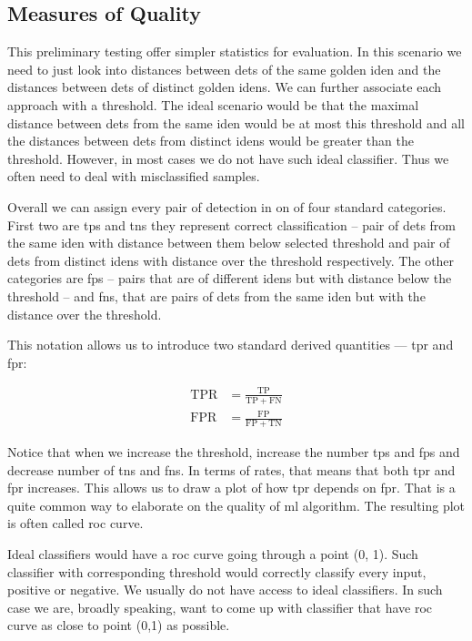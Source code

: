 \subsection{Measures of Quality}

This preliminary testing offer simpler statistics for evaluation. In this scenario we need to just look into distances between \glspl{det} of the same golden \gls{iden} and the distances between \glspl{det} of distinct golden \glspl{iden}. We can further associate each approach with a threshold. The ideal scenario would be that the maximal distance between \glspl{det} from the same \gls{iden} would be at most this threshold and all the distances between \glspl{det} from distinct \glspl{iden} would be greater than the threshold. However, in most cases we do not have such ideal classifier. Thus we often need to deal with misclassified samples.

Overall we can assign every pair of detection in on of four standard categories. First two are \glspl{tp} and \glspl{tn} they represent correct classification -- pair of \glspl{det} from the same \gls{iden} with distance between them below selected threshold and pair of \glspl{det} from distinct \glspl{iden} with distance over the threshold respectively. The other categories are \glspl{fp} -- pairs that are of different \glspl{iden} but with distance below the threshold -- and \glspl{fn}, that are pairs of \glspl{det} from the same \gls{iden} but with the distance over the threshold.

This notation allows us to introduce two standard derived quantities --- \gls{tpr} and \gls{fpr}:

\begin{align*}
    \mathrm{TPR} &= \frac{\mathrm{TP}}{\mathrm{TP} + \mathrm{FN}} \\
    \mathrm{FPR} &= \frac{\mathrm{FP}}{\mathrm{FP} + \mathrm{TN}}
\end{align*}

Notice that when we increase the threshold, increase the number \glspl{tp} and \glspl{fp} and decrease number of \glspl{tn} and \glspl{fn}. In terms of rates, that means that both \gls{tpr} and \gls{fpr} increases. This allows us to draw a plot of how \gls{tpr} depends on \gls{fpr}. That is a quite common way to elaborate on the quality of \gls{ml} algorithm. The resulting plot is often called \gls{roc} curve.

Ideal classifiers would have a \gls{roc} curve going through a point
(0, 1). Such classifier with corresponding threshold would correctly
classify every input, positive or negative. We usually do not
have access to ideal classifiers. In such case we are, broadly speaking,
want to come up with classifier that have \gls{roc} curve as close to
point (0,1) as possible.

